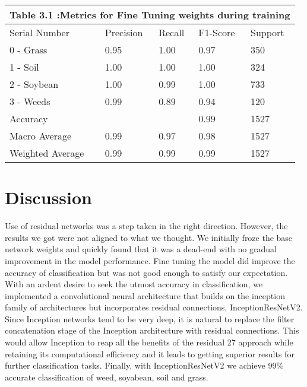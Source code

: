 \documentclass{report}
\begin{document}
\begin{tabular}[H]{ | p{3cm}||p{2cm}||p{2cm}||p{2cm}||p{2cm}|}
\hline
 \multicolumn{5}{|c|}{ Table 3.1 :Metrics for Fine Tuning weights during training}\\
 \hline
 Serial Number & Precision & Recall & F1-Score & Support\\
 \hline
 0 - Grass & 0.95 & 1.00 & 0.97 & 350 \\
 1 - Soil & 1.00 & 1.00 & 1.00 & 324\\
 2 - Soybean & 1.00 & 0.99 & 1.00 & 733\\
 3 - Weeds & 0.99 & 0.89 & 0.94 & 120 \\
 Accuracy &  &  & 0.99 & 1527\\
 Macro Average & 0.99 & 0.97 & 0.98 & 1527\\
 Weighted Average & 0.99 & 0.99 & 0.99 & 1527\\
 \hline

\end{tabular}













\section{Discussion}
Use of residual networks was a step taken in the right direction. However, the results we got were not aligned to what we thought. We initially froze the base network weights and quickly found that it was a dead-end with no gradual improvement in the model performance. Fine tuning the model did improve the accuracy of classification but was not good enough to satisfy our expectation. With an ardent desire to seek the utmost accuracy in classification, we implemented a convolutional neural architecture that builds on the inception family of architectures but incorporates residual connections, InceptionResNetV2. Since Inception networks tend to be very deep, it is natural to replace the filter concatenation stage of the Inception architecture with residual connections. This would allow Inception to reap all the benefits of the residual 27 approach while retaining its computational efficiency \cite{szegedy2017inception} and it leads to getting superior results for further classification tasks. Finally, with InceptionResNetV2 we achieve 99\% accurate classification of weed, soyabean, soil and grass. 
\end{document}
